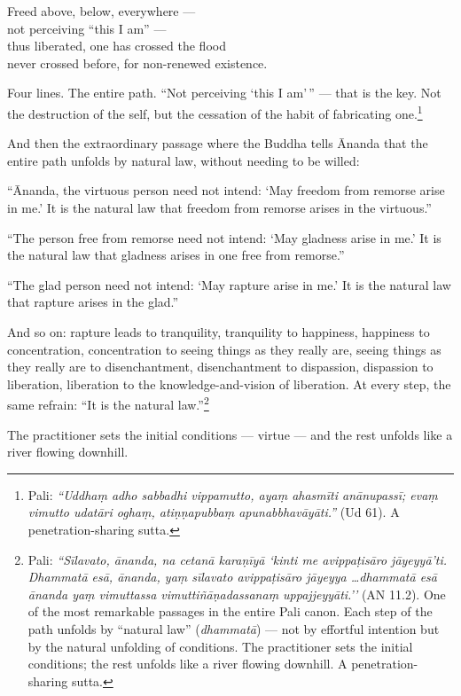 \begin{versebox}
Freed above, below, everywhere ---\\
not perceiving ``this I am'' ---\\
thus liberated, one has crossed the flood\\
never crossed before, for non-renewed existence.
\end{versebox}

\noindent Four lines. The entire path. ``Not perceiving `this I am'\,'' --- that is the key. Not the destruction of the self, but the cessation of the habit of fabricating one.\footnote{Pali: \textit{``Uddhaṃ adho sabbadhi vippamutto, ayaṃ ahasmīti anānupassī; evaṃ vimutto udatāri oghaṃ, atiṇṇapubbaṃ apunabbhavāyāti.''} (Ud 61). A penetration-sharing sutta.}

And then the extraordinary passage where the Buddha tells Ānanda that the entire path unfolds by natural law, without needing to be willed:

``Ānanda, the virtuous person need not intend: `May freedom from remorse arise in me.' It is the natural law that freedom from remorse arises in the virtuous.''

``The person free from remorse need not intend: `May gladness arise in me.' It is the natural law that gladness arises in one free from remorse.''

``The glad person need not intend: `May rapture arise in me.' It is the natural law that rapture arises in the glad.''

And so on: rapture leads to tranquility, tranquility to happiness, happiness to concentration, concentration to seeing things as they really are, seeing things as they really are to disenchantment, disenchantment to dispassion, dispassion to liberation, liberation to the knowledge-and-vision of liberation. At every step, the same refrain: ``It is the natural law.''\footnote{Pali: \textit{``Sīlavato, ānanda, na cetanā karaṇīyā `kinti me avippaṭisāro jāyeyyā'ti. Dhammatā esā, ānanda, yaṃ sīlavato avippaṭisāro jāyeyya \ldots dhammatā esā ānanda yaṃ vimuttassa vimuttiñāṇadassanaṃ uppajjeyyāti.''} (AN 11.2). One of the most remarkable passages in the entire Pali canon. Each step of the path unfolds by ``natural law'' (\textit{dhammatā}) --- not by effortful intention but by the natural unfolding of conditions. The practitioner sets the initial conditions; the rest unfolds like a river flowing downhill. A penetration-sharing sutta.}

The practitioner sets the initial conditions --- virtue --- and the rest unfolds like a river flowing downhill.

